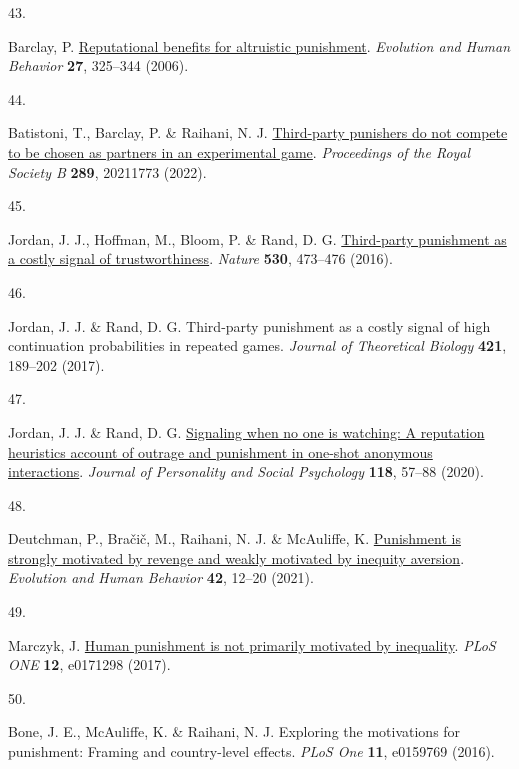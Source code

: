 \documentclass[
  man,floatsintext]{apa6}
\newlength{\cslhangindent}
\newlength{\csllabelwidth}
\newlength{\cslentryspacingunit} %
\newenvironment{CSLReferences}[2] %
 {%
  \setlength{\parindent}{0pt}
  \ifodd #1
  \let\oldpar\par
  \def\par{\hangindent=\cslhangindent\oldpar}
  \fi
  \setlength{\parskip}{#2\cslentryspacingunit}
 }%
 {}
\newcommand{\CSLLeftMargin}[1]{\parbox[t]{\csllabelwidth}{#1}}
\newcommand{\CSLRightInline}[1]{\parbox[t]{\linewidth - \csllabelwidth}{#1}\break}
\begin{document}
\begin{CSLReferences}{0}{0}
\leavevmode{}%
\CSLLeftMargin{43. }%
\CSLRightInline{Barclay, P. \href{https://doi.org/10.1016/j.evolhumbehav.2006.01.003}{Reputational benefits for altruistic punishment}. \emph{Evolution and Human Behavior} \textbf{27}, 325--344 (2006).}

\leavevmode{}%
\CSLLeftMargin{44. }%
\CSLRightInline{Batistoni, T., Barclay, P. \& Raihani, N. J. \href{https://doi.org/10.1098/rspb.2021.1773}{Third-party punishers do not compete to be chosen as partners in an experimental game}. \emph{Proceedings of the Royal Society B} \textbf{289}, 20211773 (2022).}

\leavevmode{}%
\CSLLeftMargin{45. }%
\CSLRightInline{Jordan, J. J., Hoffman, M., Bloom, P. \& Rand, D. G. \href{https://doi.org/10.1038/nature16981}{Third-party punishment as a costly signal of trustworthiness}. \emph{Nature} \textbf{530}, 473--476 (2016).}

\leavevmode{}%
\CSLLeftMargin{46. }%
\CSLRightInline{Jordan, J. J. \& Rand, D. G. Third-party punishment as a costly signal of high continuation probabilities in repeated games. \emph{Journal of Theoretical Biology} \textbf{421}, 189--202 (2017).}

\leavevmode{}%
\CSLLeftMargin{47. }%
\CSLRightInline{Jordan, J. J. \& Rand, D. G. \href{https://doi.org/10.1037/pspi0000186}{Signaling when no one is watching: A reputation heuristics account of outrage and punishment in one-shot anonymous interactions}. \emph{Journal of Personality and Social Psychology} \textbf{118}, 57--88 (2020).}

\leavevmode{}%
\CSLLeftMargin{48. }%
\CSLRightInline{Deutchman, P., Bračič, M., Raihani, N. J. \& McAuliffe, K. \href{https://doi.org/10.1016/j.evolhumbehav.2020.06.001}{Punishment is strongly motivated by revenge and weakly motivated by inequity aversion}. \emph{Evolution and Human Behavior} \textbf{42}, 12--20 (2021).}

\leavevmode{}%
\CSLLeftMargin{49. }%
\CSLRightInline{Marczyk, J. \href{https://doi.org/10.1371/journal.pone.0171298}{Human punishment is not primarily motivated by inequality}. \emph{PLoS ONE} \textbf{12}, e0171298 (2017).}

\leavevmode{}%
\CSLLeftMargin{50. }%
\CSLRightInline{Bone, J. E., McAuliffe, K. \& Raihani, N. J. Exploring the motivations for punishment: Framing and country-level effects. \emph{PLoS One} \textbf{11}, e0159769 (2016).}


\end{CSLReferences}
\end{document}
